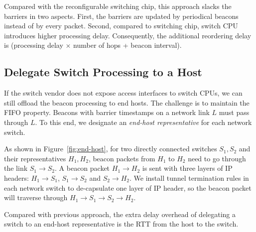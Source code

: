 Compared with the reconfigurable switching chip, this approach slacks the barriers in two aspects.
First, the barriers are updated by periodical beacons instead of by every packet.
Second, compared to switching chip, switch CPU introduces higher processing delay. Consequently, the additional reordering delay is (processing delay $\times$ number of hops + beacon interval).

\subsection{Delegate Switch Processing to a Host}
\label{sec:end-host}

If the switch vendor does not expose access interfaces to switch CPUs, we can still offload the beacon processing to end hosts. The challenge is to maintain the FIFO property. Beacons with barrier timestamps on a network link $L$ must pass through $L$. To this end, we designate an \textit{end-host representative} for each network switch. %

As shown in Figure~\ref{fig:end-host}, for two directly connected switches $S_1, S_2$ and their representatives $H_1, H_2$, beacon packets from $H_1$ to $H_2$ need to go through the link $S_1 \rightarrow S_2$. A beacon packet $H_1 \rightarrow H_2$ is sent with three layers of IP headers: $H_1 \rightarrow S_1$, $S_1 \rightarrow S_2$ and $S_2 \rightarrow H_2$.
We install tunnel termination rules in each network switch to de-capsulate one layer of IP header, so the beacon packet will traverse through $H_1 \rightarrow S_1 \rightarrow S_2 \rightarrow H_2$.

Compared with previous approach, the extra delay overhead of delegating a switch to an end-host representative is the RTT from the host to the switch.
